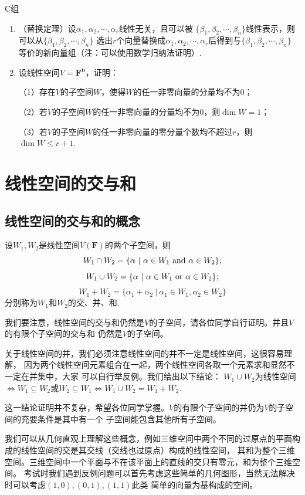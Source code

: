 \centerline{\heiti C组}
\begin{enumerate}
	\item （替换定理）设$\alpha_1,\alpha_2,\cdots,\alpha_r$线性无关，且可以被
	$\{\beta_1,\beta_2,\cdots,\beta_n\}$线性表示，则可以从$\{\beta_1,\beta_2,\cdots,\beta_n\}$
	选出$r$个向量替换成$\alpha_1,\alpha_2,\cdots,\alpha_r$后得到与$\{\beta_1,\beta_2,\cdots,\beta_n\}$
	等价的新向量组（注：可以使用数学归纳法证明）.
	\item 设线性空间$V=\mathbf{F^n}$，证明：
	
	（1）存在$V$的子空间$W$，使得$W$的任一非零向量的分量均不为0；

	（2）若$V$的子空间$W$的任一非零向量的分量均不为0，则$\dim W=1$；

	（3）若$V$的子空间$W$的任一非零向量的零分量个数均不超过$r$，则$\dim W \le r+1$.
\end{enumerate}

\section{线性空间的交与和}
\subsection{线性空间的交与和的概念}
\begin{definition}
	设$W_1,W_2$是线性空间$V(\mathbf{F})$的两个子空间，则
	$$W_1 \cap W_2=\{\alpha\ |\ \alpha\in W_1 \textup{ and } \alpha\in W_2\};$$
	$$W_1 \cup W_2=\{\alpha\ |\ \alpha\in W_1 \textup{ or } \alpha\in W_2\};$$
	$$W_1 + W_2=\{\alpha_1+\alpha_2\ |\ \alpha_1\in W_1,\alpha_2\in W_2\}$$
	分别称为$W_1$和$W_2$的交、并、和.
\end{definition}
我们要注意，线性空间的交与和仍然是$V$的子空间，请各位同学自行证明。并且$V$的有限个子空间的交与和
仍然是$V$的子空间。

关于线性空间的并，我们必须注意线性空间的并不一定是线性空间，这很容易理解，
因为两个线性空间元素组合在一起，两个线性空间各取一个元素求和显然不一定在并集中，大家
可以自行举反例。我们给出以下结论：
$W_1 \cup W_2$为线性空间$\iff W_1 \subseteq W_2$或$W_2 \subseteq W_1 \iff W_1 \cup W_2=W_1+W_2.$

这一结论证明并不复杂，希望各位同学掌握。$V$的有限个子空间的并仍为$V$的子空间的充要条件是其中有一个
子空间能包含其他所有子空间。

我们可以从几何直观上理解这些概念，例如三维空间中两个不同的过原点的平面构成的线性空间的交是其交线（交线也过原点）构成的线性空间，
其和为整个三维空间。三维空间中一个平面与不在该平面上的直线的交只有零元，和为整个三维空间。
考试时我们遇到反例问题可以首先考虑这些简单的几何图形，当然无法解决时可以考虑$(1,0),(0,1),(1,1)$此类
简单的向量为基构成的空间。

